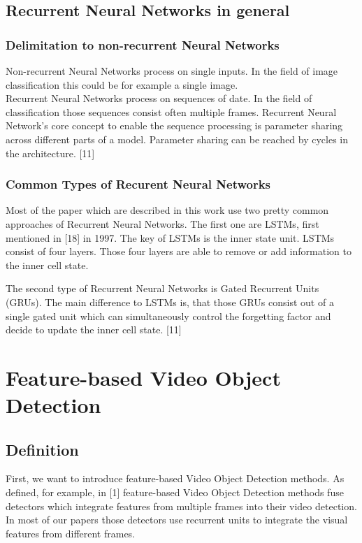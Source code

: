 \documentclass[conference]{IEEEtran}
\begin{document}
\subsection{Recurrent Neural Networks in general}
\subsubsection{Delimitation to non-recurrent Neural Networks} 
Non-recurrent Neural Networks process on single inputs. In the field of image classification this could be for example a single image. \\
Recurrent Neural Networks process on sequences of date. In the field of classification those sequences consist often multiple frames. Recurrent Neural Network's core concept to enable the sequence processing is parameter sharing across different parts of a model. Parameter sharing can be reached by cycles in the architecture. [11] \newline

\subsubsection{Common Types of Recurent Neural Networks}
Most of the paper which are described in this work use two pretty common approaches of Recurrent Neural Networks. The first one are LSTMs, first mentioned in [18] in 1997. The key of LSTMs is the inner state unit. LSTMs consist of four layers. Those four layers are able to remove or add information to the inner cell state.  \newline

The second type of Recurrent Neural Networks is Gated Recurrent Units (GRUs). The main difference to LSTMs is, that those GRUs consist out of a single gated unit which can simultaneously control the forgetting factor and decide to update the inner cell state. [11]

\section{Feature-based Video Object Detection}

\subsection{Definition}
First, we want to introduce feature-based Video Object Detection methods. As defined, for example, in [1] feature-based Video Object Detection methods fuse detectors which integrate features from multiple frames into their video detection. In most of our papers those detectors use recurrent units to integrate the visual features from different frames.  
\end{document}
